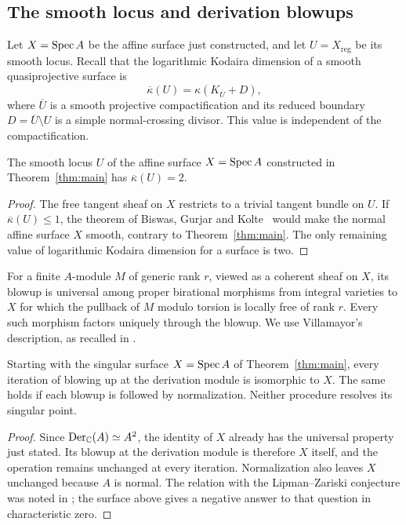 \subsection{The smooth locus and derivation blowups}

Let $X=\operatorname{Spec} A$ be the affine surface just constructed, and let
$U=X_{\mathrm{reg}}$ be its smooth locus.  Recall that the logarithmic
Kodaira dimension of a smooth quasiprojective surface is
\[
 \overline\kappa(U)=\kappa(K_{\overline U}+D),
\]
where $\overline U$ is a smooth projective compactification and its
reduced boundary $D=\overline U\setminus U$ is a simple normal-crossing
divisor.  This value is independent of the compactification.

\begin{corollary}\label{algebra:log-kodaira}
The smooth locus $U$ of the affine surface $X=\operatorname{Spec} A$ constructed in
Theorem~\ref{thm:main} has $\overline\kappa(U)=2$.
\end{corollary}

\begin{proof}
The free tangent sheaf on $X$ restricts to a trivial tangent bundle on
$U$.  If $\overline\kappa(U)\le1$, the theorem of Biswas, Gurjar and
Kolte~\cite[Theorem~0.1(1)]{BiswasGurjarKolte2014} would make the normal
affine surface $X$ smooth, contrary to Theorem~\ref{thm:main}.
The only remaining value of logarithmic Kodaira dimension for a surface
is two.
\end{proof}

For a finite $A$-module $M$ of generic rank $r$, viewed as a coherent
sheaf on $X$, its blowup is universal among proper birational morphisms
from integral varieties to $X$ for which the pullback of $M$ modulo
torsion is locally free of rank $r$.  Every such morphism factors uniquely
through the blowup.  We use Villamayor's description, as recalled in
\cite[\S1.6, Theorem~1.17]{BarajasChavezRomano2026}.

\begin{corollary}\label{algebra:derivation-blowups}
Starting with the singular surface $X=\operatorname{Spec} A$ of
Theorem~\ref{thm:main}, every iteration of blowing up at the derivation
module is isomorphic to $X$.  The same holds if each blowup is followed
by normalization.  Neither procedure resolves its singular point.
\end{corollary}

\begin{proof}
Since $\operatorname{Der}_{\mathbb C}(A)\simeq A^2$, the identity of $X$ already has the
universal property just stated.  Its blowup at the derivation module
is therefore $X$ itself, and the operation remains unchanged at every
iteration.  Normalization also leaves $X$ unchanged because $A$ is
normal.  The relation with the Lipman--Zariski conjecture was noted in
\cite[Introduction, after Question~1]{BarajasChavezRomano2026}; the
surface above gives a negative answer to that question in characteristic
zero.
\end{proof}

